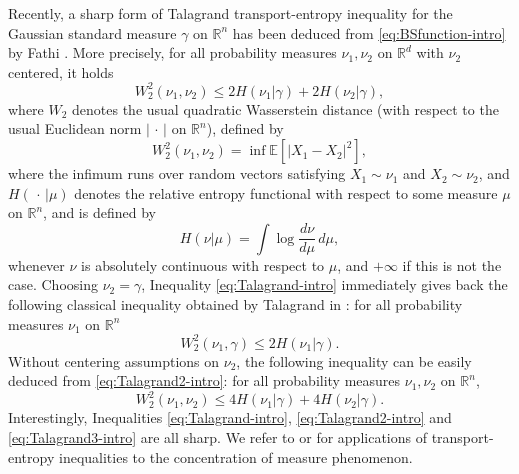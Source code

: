 \documentclass[10pt]{amsart}
\theoremstyle{definition}
\theoremstyle{remark}
\newcommand{\R}{\mathbb{R}}
\newcommand{\E}{\mathbb{E}}
\begin{document}
Recently, a sharp form of Talagrand transport-entropy inequality for the Gaussian standard measure $\gamma$ on $\R^n$  has been deduced  from \eqref{eq:BSfunction-intro} by Fathi \cite{fat18}. More precisely, for all probability measures $\nu_1,\nu_2$ on $\R^d$ with $\nu_2$ centered, it holds 
\begin{equation}\label{eq:Talagrand-intro}
W_2^2(\nu_1,\nu_2) \leq 2 H(\nu_1 |\gamma) + 2H(\nu_2 | \gamma),
\end{equation}
where $W_2$ denotes the usual quadratic Wasserstein distance (with respect to the usual Euclidean norm $|\,\cdot\,|$ on $\R^n$), defined by 
\[
W_2^2(\nu_1,\nu_2) = \inf \E[|X_1-X_2|^2],
\]
where the infimum runs over random vectors satisfying $X_1 \sim \nu_1$ and $X_2 \sim \nu_2$, and $H(\,\cdot\, | \mu)$ denotes the relative entropy functional with respect to some measure $\mu$ on $\R^n$, and is defined by 
\[
H(\nu | \mu) = \int \log \frac{d\nu}{d\mu}\,d\mu,
\]
whenever $\nu$ is absolutely continuous with respect to $\mu$, and $+\infty$ if this is not the case.
Choosing $\nu_2 = \gamma$, Inequality \eqref{eq:Talagrand-intro} immediately gives back the following classical  inequality obtained by Talagrand in \cite{Tal96}: for all probability measures $\nu_1$ on $\R^n$
\begin{equation}\label{eq:Talagrand2-intro}
W_2^2(\nu_1,\gamma) \leq 2 H(\nu_1 |\gamma).
\end{equation}
Without centering assumptions on $\nu_2$, the following inequality can be easily deduced from \eqref{eq:Talagrand2-intro}: for all probability measures $\nu_1,\nu_2$ on $\R^n$,
\begin{equation}\label{eq:Talagrand3-intro}
W_2^2(\nu_1,\nu_2) \leq 4 H(\nu_1 |\gamma) + 4H(\nu_2 | \gamma).
\end{equation}
Interestingly, Inequalities \eqref{eq:Talagrand-intro},  \eqref{eq:Talagrand2-intro} and \eqref{eq:Talagrand3-intro} are all sharp. We refer to \cite{Ledoux} or \cite{GL10} for applications of transport-entropy inequalities to the concentration  of measure phenomenon. 
\end{document}
